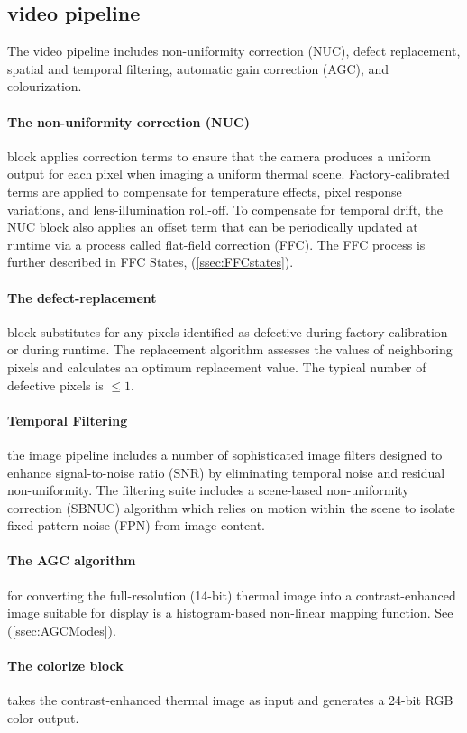 \subsection{video pipeline}
\label{ssec:pipeline}
The video pipeline includes non-uniformity correction (NUC), defect replacement,
spatial and temporal filtering, automatic gain correction (AGC), and
colourization.
%
%
\paragraph{The non-uniformity correction (NUC)} block applies correction
terms to ensure that the camera produces a uniform output for each pixel when
imaging a uniform thermal scene. Factory-calibrated terms are applied to
compensate for temperature effects, pixel response variations, and
lens-illumination roll-off. To compensate for temporal drift, the NUC block also
applies an offset term that can be periodically updated at runtime via a process
called flat-field correction (FFC). The FFC process is further described in FFC
States, (\ref{ssec:FFCstates}).
%
\paragraph{The defect-replacement} block substitutes for any pixels identified
as defective during factory calibration or during runtime. The replacement
algorithm assesses the values of neighboring pixels and calculates an optimum
replacement value. The typical number of defective pixels is $\leq 1$.
%
\paragraph{Temporal Filtering} the image pipeline includes a number of
sophisticated image filters designed to enhance signal-to-noise ratio (SNR) by
eliminating temporal noise and residual non-uniformity. The filtering suite
includes a scene-based non-uniformity correction (SBNUC) algorithm which relies
on motion within the scene to isolate fixed pattern noise (FPN) from image
content.
%
\paragraph{The AGC algorithm} for converting the full-resolution (14-bit)
thermal image into a contrast-enhanced image suitable for display is a
histogram-based non-linear mapping function. See (\ref{ssec:AGCModes}).
%
\paragraph{The colorize block} takes the contrast-enhanced thermal image as
input and generates a 24-bit RGB color output.
%
